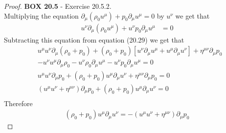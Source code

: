 \documentclass[11pt]{article}
\theoremstyle{definition}
\begin{document}
\begin{proof}{\textbf{BOX 20.5} - Exercise 20.5.2.}\\
Multiplying the equation $\partial_{\mu}(\rho_0 u^{\mu}) + p_0\partial_{\mu}u^\mu = 0$
by $u^\nu$ we get that
\begin{align*}
    u^\nu\partial_{\mu}(\rho_0 u^{\mu}) + u^\nu p_0\partial_{\mu}u^\mu
    &= 0
\end{align*}
Subtracting this equation from equation (20.29) we get that
\begin{align*}
    &u^{\mu}u^{\nu}\partial_{\mu}(\rho_0 + p_0)
    + (\rho_0 + p_0)[u^{\nu}\partial_{\mu}u^\mu + u^\mu \partial_\mu u^\nu] 
    + \eta^{\mu\nu}\partial_\mu p_0\\
    &- u^\nu u^{\mu}\partial_{\mu}\rho_0 - u^\nu \rho_0\partial_{\mu}u^\mu 
    - u^\nu p_0\partial_{\mu}u^\mu
    = 0\\[6pt]
    &u^{\mu}u^{\nu}\partial_{\mu}p_0
    + (\rho_0 + p_0)u^\mu \partial_\mu u^\nu
    + \eta^{\mu\nu}\partial_\mu p_0
    = 0\\[6pt]
    &(u^{\mu}u^{\nu} + \eta^{\mu\nu})\partial_{\mu}p_0
    + (\rho_0 + p_0)u^\mu \partial_\mu u^\nu
    = 0\\
\end{align*}
Therefore
\begin{align*}
    (\rho_0 + p_0)u^\mu \partial_\mu u^\nu
    = -(u^{\mu}u^{\nu} + \eta^{\mu\nu})\partial_{\mu}p_0
\end{align*}
\end{proof}
\end{document}
